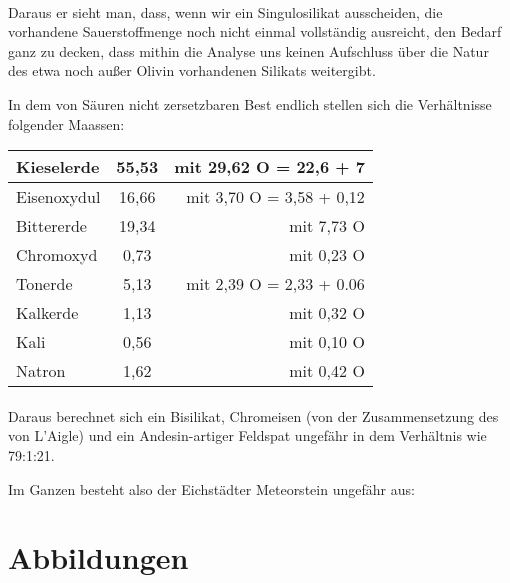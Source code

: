 \documentclass[a4paper, 11pt, oneside]{article}
\begin{document}
\paragraph{}
Daraus er sieht man, dass, wenn wir ein Singulosilikat ausscheiden, die vorhandene Sauerstoffmenge noch nicht einmal vollständig ausreicht, den Bedarf ganz zu decken, dass mithin die Analyse uns keinen Aufschluss über die Natur des etwa noch außer Olivin vorhandenen Silikats weitergibt.

In dem von Säuren nicht zersetzbaren Best endlich stellen sich die Verhältnisse folgender Maassen:
\begin{center}
\begin{tabular}{ |l|c|r| }
    \hline
    Kieselerde & 55,53 & mit 29,62 O = 22,6 + 7\\\hline
    Eisenoxydul & 16,66 & mit 3,70 O = 3,58 + 0,12\\\hline
    Bittererde & 19,34 & mit 7,73 O\\\hline
    Chromoxyd & 0,73 & mit 0,23 O\\\hline
    Tonerde & 5,13 & mit 2,39 O = 2,33 + 0.06\\\hline
    Kalkerde & 1,13 & mit 0,32 O\\\hline
    Kali & 0,56 & mit 0,10 O\\\hline
    Natron & 1,62 & mit 0,42 O\\
    \hline
\end{tabular}
\end{center}
\paragraph{}
Daraus berechnet sich ein Bisilikat, Chromeisen (von der Zusammensetzung des von L'Aigle) und ein Andesin-artiger Feldspat ungefähr in dem Verhältnis wie 79:1:21.

Im Ganzen besteht also der Eichstädter Meteorstein ungefähr aus:
\clearpage
\section{Abbildungen}
\clearpage
\pagestyle{fancy}
\fancyhf{}
\cfoot{\thepage}
\begin{figure}[t]
\centering
\end{figure}
\clearpage
{}
\begin{figure}[t]
\centering
\end{figure}
\clearpage
\end{document}
